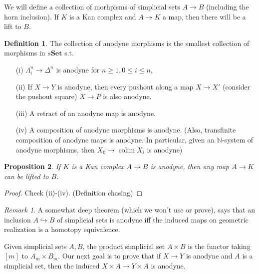 \documentclass{article}
\theoremstyle{definition}
\newtheorem{defn}{Definition}[section]
\theoremstyle{remark}
\newtheorem{rem}{Remark}
\theoremstyle{plain}
\newtheorem{prop}[defn]{Proposition}
\newcommand{\NN}{\mathbb{N}}
\newcommand{\bset}{\mathbf{Set}}
\begin{document}
We will define a collection of morhpisms of simplicial sets $A\to B$ (including the horn inclusion). If $K$ is a Kan complex and $A\to K$ a map, then there will be a lift to $B$.
\begin{defn}
    The collection of anodyne morphisms is the smallest collection of morphisms in $s\bset$ s.t.
    \begin{enumerate}
        \item[(i)] $\Lambda_i^n\to\Delta^n$ is anodyne for $n\ge 1, 0\le i\le n$,
        \item[(ii)] If $X\to Y$ is anodyne, then every pushout along a map $X\to X'$ (consider the pushout square) $X\to P$ is also anodyne.
        \item[(iii)] A retract of an anodyne map is anodyne.
        \item[(iv)] A composition of anodyne morphisms is anodyne. (Also, transfinite composition of anodyne maps is anodyne. In particular, given an $\NN$-system of anodyne morphisms, then $X_0\to\operatorname{colim} X_i$ is anodyne)
    \end{enumerate}
\end{defn}
\begin{prop}
    If $K$ is a Kan complex $A\to B$ is anodyne, then any map $A\to K$ can be lifted to $B$.
\end{prop}
\begin{proof}
    Check (ii)-(iv). (Definition chasing)
\end{proof}
\begin{rem}
    A somewhat deep theorem (which we won't use or prove), says that an inclusion $A\hookrightarrow B$ of simplicial sets is anodyne iff the induced maps on geometric realization is a homotopy equivalence.
\end{rem}
Given simplicial sets $A, B$, the product simplicial set $A\times B$ is the functor taking $[m]$ to $A_m\times B_m$. Our next goal is to prove that if $X\to Y$ is anodyne and $A$ is a simplicial set, then the induced $X\times A\to Y\times A$ is anodyne.
\end{document}
